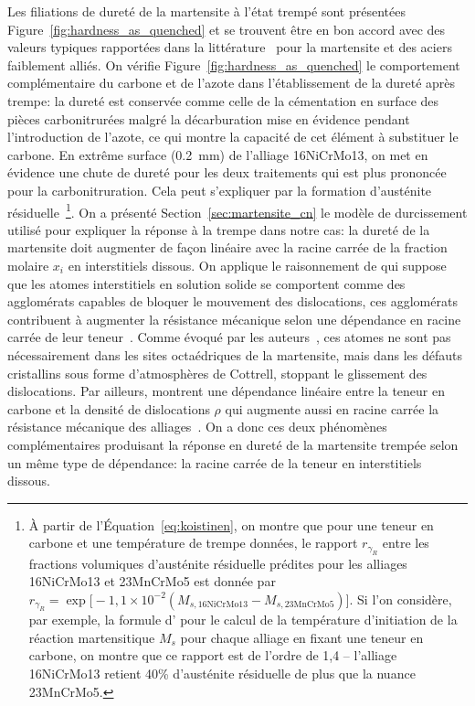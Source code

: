 Les filiations de dureté de la martensite à l'état trempé sont présentées Figure~\ref{fig:hardness_as_quenched} et se trouvent être en bon accord avec des valeurs typiques rapportées dans la littérature~\cite{Grange1977,Krauss1999,Hutchinson20115845,Ferro2014} pour la martensite  et des aciers faiblement alliés. On vérifie Figure~\ref{fig:hardness_as_quenched} le comportement complémentaire du carbone et de l'azote dans l'établissement de la dureté après trempe: la dureté est conservée comme celle de la cémentation en surface des pièces carbonitrurées malgré la décarburation mise en évidence pendant l'introduction de l'azote, ce qui montre la capacité de cet élément à substituer le carbone. En extrême surface (\SI{0,2}{\milli\metre}) de l'alliage 16NiCrMo13, on met en évidence une chute de dureté pour les deux traitements qui est plus prononcée pour la carbonitruration. Cela peut s'expliquer par la formation d'austénite résiduelle~\footnote{À partir de l'Équation~\ref{eq:koistinen}, on montre que pour une teneur en carbone et une température de trempe données, le rapport $r_{\gamma_{R}}$ entre les fractions volumiques d'austénite résiduelle prédites pour les alliages 16NiCrMo13 et 23MnCrMo5 est donnée par $r_{\gamma_{R}}=\exp\big[-1,1\times 10^{-2}(M_{s,\mathrm{16NiCrMo13}}-M_{s,\mathrm{23MnCrMo5}})\big]$. Si l'on considère, par exemple, la formule d'\citet{Andrews1965} pour le calcul de la température d'initiation de la réaction martensitique $M_s$ pour chaque alliage en fixant une teneur en carbone, on montre que ce rapport est de l'ordre de 1,4 -- l'alliage 16NiCrMo13 retient 40\% d'austénite résiduelle de plus que la nuance 23MnCrMo5.}. 
On a présenté Section~\ref{sec:martensite_cn} le modèle de durcissement utilisé pour expliquer la réponse à la trempe dans notre cas: la dureté de la martensite doit augmenter de façon linéaire avec la racine carrée de la fraction molaire $x_{i}$ en interstitiels dissous. On applique le raisonnement de \citet{Hutchinson20115845} qui suppose que les atomes interstitiels en solution solide se comportent comme des agglomérats capables de bloquer le mouvement des dislocations, ces agglomérats contribuent à augmenter la résistance mécanique selon une dépendance en racine carrée de leur teneur~\cite{Haasen19962009}. Comme évoqué par les auteurs~\cite{Hutchinson20115845}, ces atomes ne sont pas nécessairement dans les sites octaédriques de la martensite, mais dans les défauts cristallins sous forme d'atmosphères de Cottrell, stoppant le glissement des dislocations. Par ailleurs, \citet{Morito20031475} montrent une dépendance linéaire entre la teneur en carbone et la densité de dislocations $\rho$ qui augmente aussi en racine carrée la résistance mécanique des alliages~\cite{Cohen1968,Norstrom1976,Krauss1999,Hutchinson20115845}. On a donc ces deux phénomènes complémentaires produisant la réponse en dureté de la martensite trempée selon un même type de dépendance: la racine carrée de la teneur en interstitiels dissous. 

